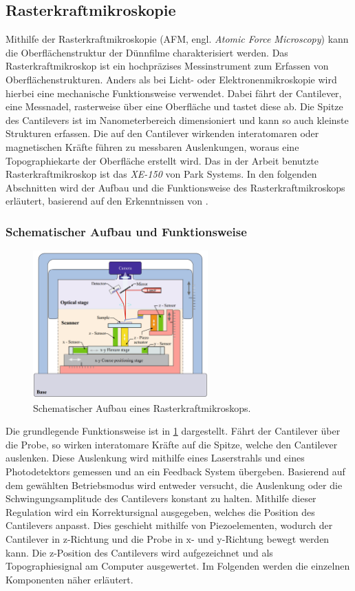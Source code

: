 \subsection{Rasterkraftmikroskopie}\label{subsec:afm}
Mithilfe der Rasterkraftmikroskopie (AFM, engl. \textit{Atomic Force Microscopy}) kann die Oberflächenstruktur der
Dünnfilme charakterisiert werden.
Das Rasterkraftmikroskop ist ein hochpräzises Messinstrument zum Erfassen von Oberflächenstrukturen.
Anders als bei Licht- oder Elektronenmikroskopie wird hierbei eine mechanische Funktionsweise verwendet.
Dabei fährt der Cantilever, eine Messnadel, rasterweise über eine Oberfläche und tastet diese ab.
Die Spitze des Cantilevers ist im Nanometerbereich dimensioniert und kann so auch kleinste Strukturen erfassen.
Die auf den Cantilever wirkenden interatomaren oder magnetischen Kräfte führen zu messbaren Auslenkungen,
woraus eine Topographiekarte der Oberfläche erstellt wird.
Das in der Arbeit benutzte Rasterkraftmikroskop ist das \textit{XE-150} von Park Systems.
In den folgenden Abschnitten wird der Aufbau und die Funktionsweise des Rasterkraftmikroskops
erläutert, basierend auf den Erkenntnissen von  \autocite{afm-buch}.

\subsubsection{Schematischer Aufbau und Funktionsweise}
\begin{figure}
    \centering
    \includegraphics[width=0.6\textwidth]{../assets/messmethoden/afm/01_aufbau}
    \caption{Schematischer Aufbau eines Rasterkraftmikroskops. }
    \label{fig:afm_aufbau}
\end{figure}
Die grundlegende Funktionsweise ist in \cref{fig:afm_aufbau} dargestellt.
Fährt der Cantilever über die Probe, so wirken interatomare Kräfte auf die Spitze, welche den Cantilever auslenken.
Diese Auslenkung wird mithilfe eines Laserstrahls und eines Photodetektors gemessen und an ein Feedback System
übergeben.
Basierend auf dem gewählten Betriebsmodus wird entweder versucht, die Auslenkung oder die Schwingungsamplitude
des Cantilevers konstant zu halten.
Mithilfe dieser Regulation wird ein Korrektursignal ausgegeben, welches die Position des Cantilevers anpasst.
Dies geschieht mithilfe von Piezoelementen, wodurch der Cantilever in $\mathrm{z}$-Richtung und die Probe in
$\mathrm{x}$- und
$\mathrm{y}$-Richtung bewegt werden kann.
Die z-Position des Cantilevers wird aufgezeichnet und als Topographiesignal am Computer ausgewertet.
Im Folgenden werden die einzelnen Komponenten näher erläutert.

